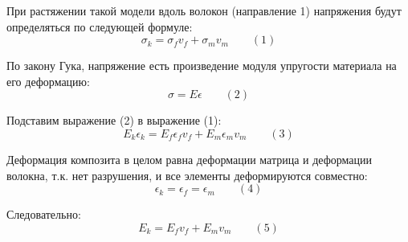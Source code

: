 При растяжении такой модели вдоль волокон (направление 1) напряжения будут определяться по следующей формуле:
$$\sigma_k=\sigma_f v_f+\sigma_m v_m \qquad (1)$$

По закону Гука, напряжение есть произведение модуля упругости материала на его деформацию:
$$\sigma=E \epsilon \qquad (2)$$

Подставим выражение (2) в выражение (1):
$$E_k \epsilon_k=E_f \epsilon_f v_f+E_m \epsilon_m v_m \qquad (3)$$

Деформация композита в целом равна деформации матрица и деформации волокна, т.к. нет разрушения, и все элементы деформируются совместно:
$$\epsilon_k=\epsilon_f=\epsilon_m \qquad (4)$$

Следовательно:
$$E_k=E_f v_f+E_m v_m \qquad (5)$$

